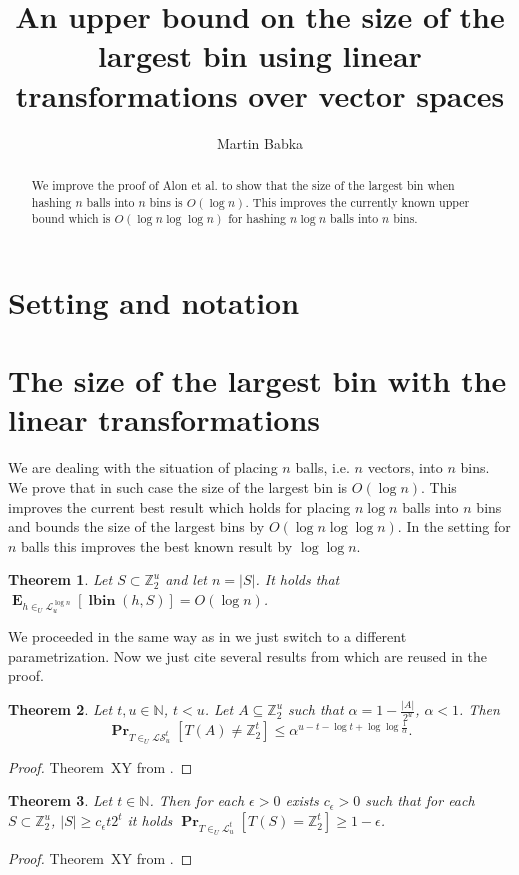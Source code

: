 \documentclass{article}
\title{An upper bound on the size of the largest bin using linear transformations over vector spaces}
\author{Martin Babka}
\newcommand{\lbin}[2]{\operatorname{\mathbf{lbin}}({#1}, {#2})}
\newcommand{\vecspace}[2]{\mathbb{Z}_{#1}^{#2}}
\newcommand{\binvecspace}[1]{\vecspace{2}{#1}}
\newcommand{\linearmaps}[2]{\mathcal{L}_{#1}^{#2}}
\newcommand{\surjectivelinearmaps}[2]{\mathcal{LS}_{#1}^{#2}}
\newcommand{\probs}[2]{\operatorname{\mathbf{Pr}}_{{#1}}\left[{#2}\right]}
\newcommand{\expects}[2]{\operatorname{\mathbf{E}}_{{#1}}\left[{#2}\right]}
\newtheorem{theorem}{Theorem}
\begin{document}
\maketitle

\begin{abstract}
We improve the proof of Alon et al. to show that the size of the largest bin when hashing $n$ balls into $n$ bins is $O(\log n)$. This improves the currently known upper bound which is $O(\log n \log \log n)$ for hashing $n \log n$ balls into $n$ bins.
\end{abstract}

\section{Setting and notation}

\section{The size of the largest bin with the linear transformations}

We are dealing with the situation of placing $n$ balls, i.e. $n$ vectors, into $n$ bins.
We prove that in such case the size of the largest bin is $O(\log n)$. 
This improves the current best result which holds for placing $n \log n$ balls into $n$ bins and bounds the size of the largest bins by $O(\log n \log \log n)$.
In the setting for $n$ balls this improves the best known result by  $\log \log n$.
\begin{theorem}
Let $S \subset \binvecspace{u}$ and let $n = |S|$. It holds that $\expects{h \in_U \linearmaps{u}{\log n}}{\lbin{h}{S}} = O(\log n)$.
\end{theorem}
We proceeded in the same way as in \cite{alonetal} we just switch to a different parametrization.
Now we just cite several results from \cite{alonetal} which are reused in the proof.
\begin{theorem}
\label{theorem-prob-bound}
Let $t, u \in \mathbb{N}$, $t < u$.
Let $A \subseteq \binvecspace{u}$ such that $\alpha = 1 - \frac{|A|}{2^u}$, $\alpha < 1$.
Then 
\[
\probs{T \in_U \surjectivelinearmaps{u}{t}}{T(A) \neq \binvecspace{t}} \leq \alpha^{u - t - \log t + \log \log \frac{1}{\alpha}}.
\]
\end{theorem}
\begin{proof}
Theorem~{XY} from \cite{alonetal}.
\end{proof}

\begin{theorem}
\label{theorem-epsilon}
Let $t \in \mathbb{N}$.
Then for each $\epsilon > 0$ exists $c_\epsilon > 0$ such that for each $S \subset \binvecspace{u}$, $|S| \geq c_\epsilon t 2^t$ it holds  $\probs{T \in_U \linearmaps{u}{t}}{T(S) = \binvecspace{t}} \geq 1 - \epsilon$.
\end{theorem}
\begin{proof}
Theorem~{XY} from \cite{alonetal}.
\end{proof}
\end{document}
